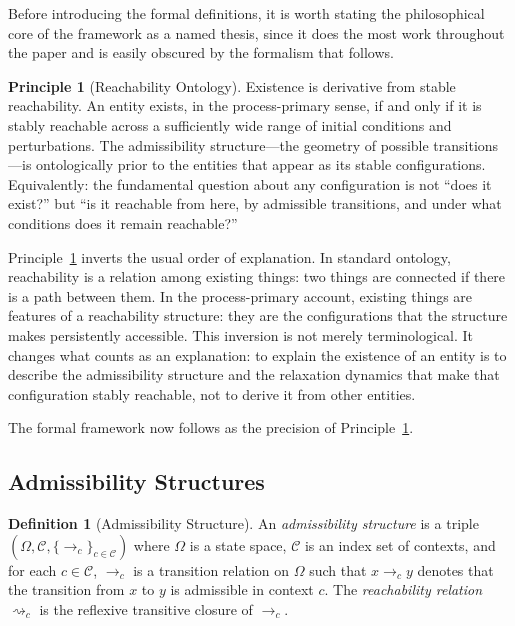 \documentclass[12pt, a4paper]{article}
\theoremstyle{plain}
\theoremstyle{definition}
\newtheorem{definition}[theorem]{Definition}
\newtheorem{principle}[theorem]{Principle}
\theoremstyle{remark}
\begin{document}
Before introducing the formal definitions, it is worth stating the philosophical
core of the framework as a named thesis, since it does the most work throughout
the paper and is easily obscured by the formalism that follows.

\begin{principle}[Reachability Ontology]
\label{prin:reach-onto}
Existence is derivative from stable reachability. An entity exists, in the
process-primary sense, if and only if it is stably reachable across a
sufficiently wide range of initial conditions and perturbations. The
admissibility structure---the geometry of possible transitions---is
ontologically prior to the entities that appear as its stable configurations.
Equivalently: the fundamental question about any configuration is not
``does it exist?'' but ``is it reachable from here, by admissible transitions,
and under what conditions does it remain reachable?''
\end{principle}

Principle~\ref{prin:reach-onto} inverts the usual order of explanation.
In standard ontology, reachability is a relation among existing things:
two things are connected if there is a path between them. In the
process-primary account, existing things are features of a reachability
structure: they are the configurations that the structure makes persistently
accessible. This inversion is not merely terminological. It changes what
counts as an explanation: to explain the existence of an entity is to describe
the admissibility structure and the relaxation dynamics that make that
configuration stably reachable, not to derive it from other entities.

The formal framework now follows as the precision of Principle~\ref{prin:reach-onto}.

\subsection{Admissibility Structures}

\begin{definition}[Admissibility Structure]
\label{def:admissibility}
An \emph{admissibility structure} is a triple $(\Omega, \mathcal{C},
\{\to_c\}_{c \in \mathcal{C}})$ where $\Omega$ is a state space,
$\mathcal{C}$ is an index set of contexts, and for each $c \in \mathcal{C}$,
$\to_c$ is a transition relation on $\Omega$ such that $x \to_c y$ denotes
that the transition from $x$ to $y$ is admissible in context $c$. The
\emph{reachability relation} $\rightsquigarrow_c$ is the reflexive transitive
closure of $\to_c$.
\end{definition}
\end{document}
